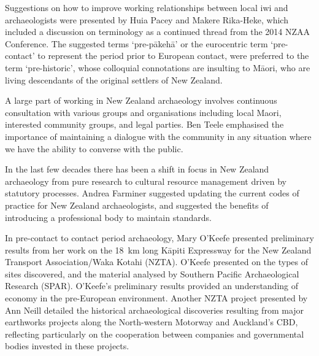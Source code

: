 
Suggestions on how to improve working relationships between local iwi and archaeologists were presented by Huia Pacey and Makere Rika-Heke, which included a discussion on terminology as a continued thread from the 2014 NZAA Conference. The suggested terms ‘pre-pākehā’ or the eurocentric term ‘pre-contact’ to represent the period prior to European contact, were preferred to the term ‘pre-historic’, whose colloquial connotations are insulting to Māori, who are living descendants of the original settlers of New Zealand.

A large part of working in New Zealand archaeology involves continuous consultation with various groups and organisations including local Maori, interested community groups, and legal parties. Ben Teele emphasised the importance of maintaining a dialogue with the community in any situation where we have the ability to converse with the public.

In the last few decades there has been a shift in focus in New Zealand archaeology from pure research to cultural resource management driven by statutory processes. Andrea Farminer suggested updating the current codes of practice for New Zealand archaeologists, and suggested the benefits of introducing a professional body to maintain standards.


In pre-contact to contact period archaeology, Mary O’Keefe presented preliminary results from her work on the \SI{18}{\kilo\metre} long Kāpiti Expressway for the New Zealand Transport Association/Waka Kotahi (NZTA). O'Keefe presented on the types of sites discovered, and the material analysed by Southern Pacific Archaeological Research (SPAR). O'Keefe's preliminary results provided an understanding of economy in the pre-European environment. Another NZTA project presented by Ann Neill detailed the historical archaeological discoveries resulting from major earthworks projects along the North-western Motorway and Auckland’s CBD, reflecting particularly on the cooperation between companies and governmental bodies invested in these projects. 

